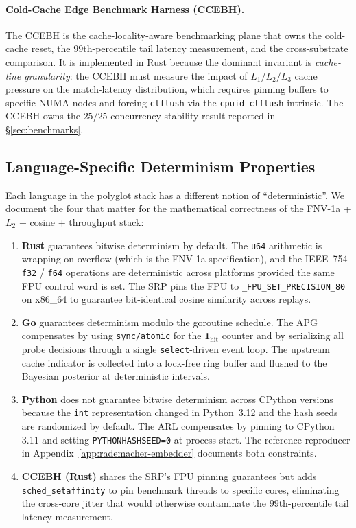 \paragraph{Cold-Cache Edge Benchmark Harness (CCEBH).}
The CCEBH is the cache-locality-aware benchmarking plane that owns the
cold-cache reset, the $99$th-percentile tail latency measurement, and
the cross-substrate comparison. It is implemented in Rust because the
dominant invariant is \emph{cache-line granularity}: the CCEBH must
measure the impact of $L_1 / L_2 / L_3$ cache pressure on the
match-latency distribution, which requires pinning buffers to specific
NUMA nodes and forcing \texttt{clflush} via the
\texttt{cpuid\_clflush} intrinsic. The CCEBH owns the $25/25$
concurrency-stability result reported in \S\ref{sec:benchmarks}.

\subsection{Language-Specific Determinism Properties}

Each language in the polyglot stack has a different notion of
``deterministic''. We document the four that matter for the
mathematical correctness of the FNV-1a + $L_2$ + cosine + throughput
stack:

\begin{enumerate}
\item \textbf{Rust} guarantees bitwise determinism by default. The
\texttt{u64} arithmetic is wrapping on overflow (which is the FNV-1a
specification), and the IEEE~754 \texttt{f32} / \texttt{f64} operations
are deterministic across platforms provided the same FPU control word
is set. The SRP pins the FPU to \texttt{_FPU\_SET\_PRECISION\_80} on
x86\_64 to guarantee bit-identical cosine similarity across replays.

\item \textbf{Go} guarantees determinism modulo the goroutine
schedule. The APG compensates by using \texttt{sync/atomic} for the
$\mathbf{1}_{\text{hit}}$ counter and by serializing all probe
decisions through a single \texttt{select}-driven event loop. The
upstream cache indicator is collected into a lock-free ring buffer
and flushed to the Bayesian posterior at deterministic intervals.

\item \textbf{Python} does not guarantee bitwise determinism across
CPython versions because the \texttt{int} representation changed in
Python~3.12 and the hash seeds are randomized by default. The ARL
compensates by pinning to CPython 3.11 and setting
\texttt{PYTHONHASHSEED=0} at process start. The reference reproducer
in Appendix~\ref{app:rademacher-embedder} documents both constraints.

\item \textbf{CCEBH (Rust)} shares the SRP's FPU pinning guarantees
but adds \texttt{sched\_setaffinity} to pin benchmark threads to
specific cores, eliminating the cross-core jitter that would otherwise
contaminate the $99$th-percentile tail latency measurement.
\end{enumerate}

